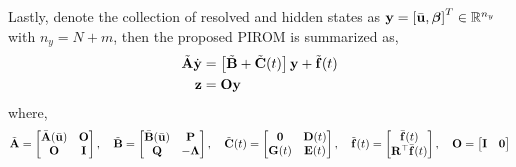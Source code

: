 Lastly, denote the collection of resolved and hidden states as $\mathbf{y} = \left[\bar{\mathbf{u}},\boldsymbol{\beta}\right]^T\in\mathbb{R}^{n_y}$ with $n_y = N+m$, then the proposed PIROM is summarized as,
\begin{subequations}
    \begin{align}
        \tilde{\mathbf{A}}\dot{\mathbf{y}} &= \left[\tilde{\mathbf{B}} +\tilde{\mathbf{C}}(t)\right]\mathbf{y} + \tilde{\mathbf{f}}(t)\\
        \mathbf{z} &= \mathbf{O}\mathbf{y}
    \end{align}
\end{subequations}
where,
\begin{gather}
    \tilde{\mathbf{A}} = \begin{bmatrix}
        \bar{\mathbf{A}}(\bar{\mathbf{u}}) & \mathbf{O}\\
        \mathbf{O} & \mathbf{I}
    \end{bmatrix},\quad \tilde{\mathbf{B}} = \begin{bmatrix}
        \bar{\mathbf{B}}(\bar{\mathbf{u}}) & \mathbf{P}\\
        \mathbf{Q} & -\boldsymbol{\Lambda}
    \end{bmatrix},\quad\tilde{\mathbf{C}}(t) = \begin{bmatrix}
        \boldsymbol{0} & \mathbf{D}(t)\\
        \mathbf{G}(t) & \mathbf{E}(t)
    \end{bmatrix},\quad
    \tilde{\mathbf{f}}(t) = \begin{bmatrix}
        \bar{\mathbf{f}}(t)\\
        \mathbf{R}^{\top}\bar{\mathbf{f}}(t)
    \end{bmatrix},\quad
    \mathbf{O} = \begin{bmatrix}
        \mathbf{I} & \boldsymbol{0}
    \end{bmatrix}
\end{gather}




